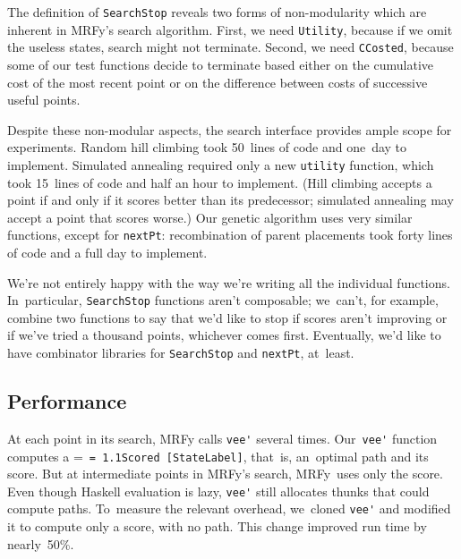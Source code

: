 \documentclass[]{jfp1}
\makeatletter
\newcommand\mrfy{MRFy} %
\newcommand\seclabel[1]{\label{sec:#1}}
\newcommand{\mono}[1]{%
  {\@tempdima = \fontdimen2\font
   \texttt{\spaceskip = 1.1\@tempdima #1}}}
\makeatother
\begin{document}
The definition of \texttt{SearchStop} reveals two forms of
non-modularity which are inherent in \mrfy's search algorithm.
First, we need \texttt{Utility}, because if we omit the useless states,
search might not terminate.
Second, we need \texttt{CCosted}, because some of our test functions
decide to terminate based either on the cumulative cost of the most
recent point or on the difference between costs of successive useful points.

Despite these non-modular aspects, the search
interface provides ample scope for
experiments.
Random hill climbing took 50~lines of code and one~day to
implement.  
Simulated annealing required only a new
\texttt{utility} function, which took 15~lines of code and half an hour to implement.
(Hill climbing accepts a point if and only if it scores better than its
predecessor;
simulated annealing may accept a point that scores worse.)
Our genetic algorithm uses very similar
functions, except for \texttt{nextPt}:
recombination of parent
placements took forty lines of code
and a full day to implement.

We're not entirely happy with the way we're writing all the individual
functions.
In~particular, \texttt{SearchStop} functions aren't composable;
we~can't, for example, combine two functions to say that we'd like to
stop if scores aren't improving or if we've tried a thousand points,
whichever comes first.
Eventually, we'd like to have
combinator libraries for \texttt{SearchStop} and \texttt{nextPt}, at~least.



\subsection{Performance}

\seclabel{perf}
\seclabel{performance}

At each point in its search,
MRFy calls \verb+vee'+ several
 times.
Our~\verb+vee'+
function computes a \mbox{\mono{Scored [StateLabel]}}, that~is, 
an~optimal path and its score.
But at intermediate points in \mrfy's search,
\mrfy\ uses only the
score.
Even though Haskell evaluation is lazy, \verb+vee'+ 
still allocates thunks that could compute paths.
To~measure the relevant overhead,
we~cloned \verb+vee'+ and modified it to compute
only a score, with no path.
This change improved 
run time by nearly~50\%.
\end{document}
